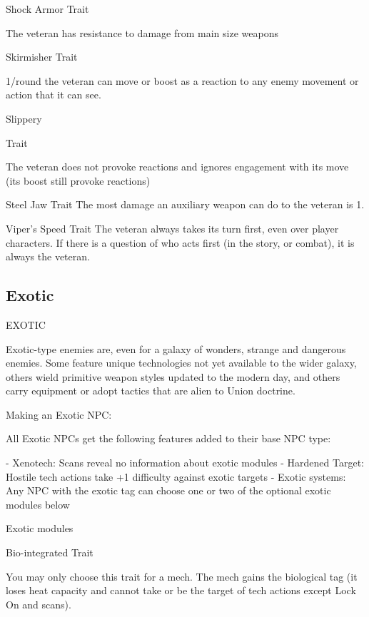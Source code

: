 Shock Armor  
Trait
 
The veteran has resistance to damage from main size weapons
 

Skirmisher  
Trait
 
1/round the veteran can move or boost as a reaction to any enemy movement or action that it  
can see.
 

Slippery
 
Trait
 
The veteran does not provoke reactions and ignores engagement with its move (its boost still  
provoke reactions) 
 

Steel Jaw  
Trait  
The most damage an auxiliary weapon can do to the veteran is 1.
 

Viper’s Speed  
Trait  
The veteran always takes its turn first, even over player characters. If there is a question of who  
acts first (in the story, or combat), it is always the veteran.
 
\subsection{Exotic}
                                                      EXOTIC   

Exotic-type enemies are, even for a galaxy of wonders, strange and dangerous enemies. Some  
feature unique technologies not yet available to the wider galaxy, others wield primitive weapon  
styles updated to the modern day, and others carry equipment or adopt tactics that are alien to  
Union doctrine.  
 
 
Making an Exotic NPC:
 
All Exotic NPCs get the following features added to their base NPC type:
 
     -   Xenotech: Scans reveal no information about exotic modules  
     -   Hardened Target: Hostile tech actions take +1 difficulty against exotic targets  
     -   Exotic systems: Any NPC with the exotic tag can choose one or two of the optional  
         exotic modules below  

Exotic modules
 
Bio-integrated  
Trait
 
You may only choose this trait for a mech. The mech gains the biological tag (it loses heat  
capacity and cannot take or be the target of tech actions except Lock On and scans).
 

                                                                                                                     


